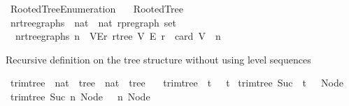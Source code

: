 %
\begin{isabellebody}%
%
%
\isadelimtheory
%
\endisadelimtheory
%
\isatagtheory
{}\isamarkupfalse%
\ Rooted{\isacharunderscore}{\kern0pt}Tree{\isacharunderscore}{\kern0pt}Enumeration\isanewline
\ \ \ Rooted{\isacharunderscore}{\kern0pt}Tree\isanewline
{}%
\endisatagtheory
{\isafoldtheory}%
%
\isadelimtheory
\isanewline
%
\endisadelimtheory
\isanewline
{}\isamarkupfalse%
\ n{\isacharunderscore}{\kern0pt}rtree{\isacharunderscore}{\kern0pt}graphs\ {\isacharcolon}{\kern0pt}{\isacharcolon}{\kern0pt}\ {\isachardoublequoteopen}nat\ {\isasymRightarrow}\ nat\ rpregraph\ set{\isachardoublequoteclose}\ \isanewline
\ \ {\isachardoublequoteopen}n{\isacharunderscore}{\kern0pt}rtree{\isacharunderscore}{\kern0pt}graphs\ n\ {\isacharequal}{\kern0pt}\ {\isacharbraceleft}{\kern0pt}{\isacharparenleft}{\kern0pt}V{\isacharcomma}{\kern0pt}E{\isacharcomma}{\kern0pt}r{\isacharparenright}{\kern0pt}{\isachardot}{\kern0pt}\ rtree\ V\ E\ r\ {\isasymand}\ card\ V\ {\isacharequal}{\kern0pt}\ n{\isacharbraceright}{\kern0pt}{\isachardoublequoteclose}%
\begin{isamarkuptext}%
Recursive definition on the tree structure without using level sequences%
\end{isamarkuptext}\isamarkuptrue%
\isamarkupfalse%
\ trim{\isacharunderscore}{\kern0pt}tree\ {\isacharcolon}{\kern0pt}{\isacharcolon}{\kern0pt}\ {\isachardoublequoteopen}nat\ {\isasymRightarrow}\ tree\ {\isasymRightarrow}\ nat\ {\isasymtimes}\ tree{\isachardoublequoteclose}\ \isanewline
\ \ {\isachardoublequoteopen}trim{\isacharunderscore}{\kern0pt}tree\ {}\ t\ {\isacharequal}{\kern0pt}\ {\isacharparenleft}{\kern0pt}{}{\isacharcomma}{\kern0pt}\ t{\isacharparenright}{\kern0pt}{\isachardoublequoteclose}\isanewline
{\isacharbar}{\kern0pt}\ {\isachardoublequoteopen}trim{\isacharunderscore}{\kern0pt}tree\ {\isacharparenleft}{\kern0pt}Suc\ {}{\isacharparenright}{\kern0pt}\ t\ {\isacharequal}{\kern0pt}\ {\isacharparenleft}{\kern0pt}{}{\isacharcomma}{\kern0pt}\ Node\ {\isacharbrackleft}{\kern0pt}{\isacharbrackright}{\kern0pt}{\isacharparenright}{\kern0pt}{\isachardoublequoteclose}\isanewline
{\isacharbar}{\kern0pt}\ {\isachardoublequoteopen}trim{\isacharunderscore}{\kern0pt}tree\ {\isacharparenleft}{\kern0pt}Suc\ n{\isacharparenright}{\kern0pt}\ {\isacharparenleft}{\kern0pt}Node\ {\isacharbrackleft}{\kern0pt}{\isacharbrackright}{\kern0pt}{\isacharparenright}{\kern0pt}\ {\isacharequal}{\kern0pt}\ {\isacharparenleft}{\kern0pt}n{\isacharcomma}{\kern0pt}\ Node\ {\isacharbrackleft}{\kern0pt}{\isacharbrackright}{\kern0pt}{\isacharparenright}{\kern0pt}{\isachardoublequoteclose}\isanewline

\end{isabellebody}
